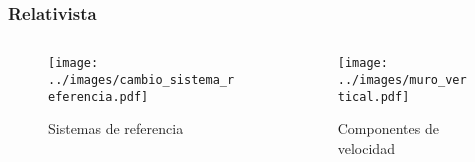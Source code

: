 \documentclass{beamer}
\begin{document}

\begin{frame}
    \frametitle[prueb1]{Relativista}
    \begin{columns}
        \hspace{0.5cm}
        \begin{column}{0.5\textwidth}
            \vspace{1.5mm}
            \begin{figure}
                \centering
                \texttt{[image: ../images/cambio\_sistema\_referencia.pdf]}
                \caption{Sistemas de referencia}
            \end{figure}         
        \end{column}
        \begin{column}{0.5\textwidth}
            \begin{figure}
                \centering
                \texttt{[image: ../images/muro\_vertical.pdf]}
                \caption{Componentes de velocidad}
            \end{figure}
        \end{column}
    \end{columns}
\end{frame}
\end{document}
